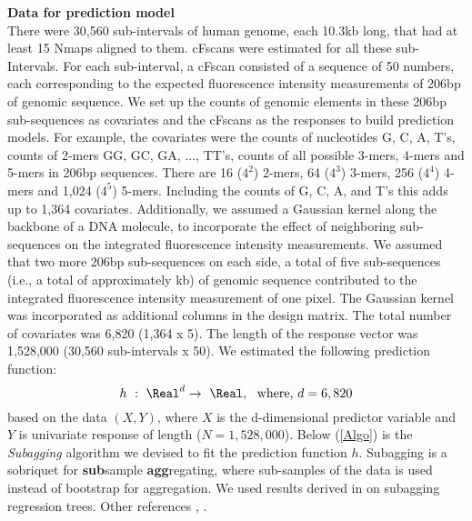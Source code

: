 \noindent
{\bf{Data for prediction model}} \\
There were 30,560 sub-intervals of human genome, each 10.3kb long, that had at least 15 Nmaps aligned to them. cFscans were estimated for all these sub-Intervals. For each sub-interval, a cFscan consisted of a sequence of 50 numbers, each corresponding to the expected fluorescence intensity measurements of 206bp of genomic sequence. We set up the counts of genomic elements in these 206bp sub-sequences as covariates and the cFscans as the responses to build prediction models. For example, the covariates were the counts of nucleotides G, C, A, T's, counts of 2-mers GG, GC, GA, ..., TT's, counts of all possible 3-mers, 4-mers and 5-mers in 206bp sequences. There are 16 ($4^2$) 2-mers, 64 ($4^3$) 3-mers, 256 ($4^4$) 4-mers and 1,024 ($4^5$) 5-mers. Including the counts of G, C, A, and T's this adds up to 1,364 covariates. Additionally, we assumed a Gaussian kernel along the backbone of a DNA molecule, to incorporate the effect of neighboring sub-sequences on the integrated fluorescence intensity measurements. We assumed that two more 206bp sub-sequences on each side, a total of five sub-sequences (i.e., a total of approximately kb) of genomic sequence contributed to the integrated fluorescence intensity measurement of one pixel. The Gaussian kernel was incorporated as additional columns in the design matrix. The total number of covariates was 6,820 (1,364 x 5). The length of the response vector was 1,528,000 (30,560 sub-intervals x 50). We estimated the following prediction function:
\begin{equation}
h \ :\ \Real ^d \rightarrow \ \Real, \ \ \text{where, } d = 6,820
\label{eq:BigModel}
\end{equation}
based on the data $(X, Y)$, where $X$ is the d-dimensional predictor variable and $Y$ is univariate response of length ($N = 1,528,000$). 
Below (\ref{Algo}) is the {\emph{Subagging}} algorithm we devised to fit the prediction function $h$. Subagging is a sobriquet for {\bf{sub}}sample {\bf{agg}}regating, where sub-samples of the data is used instead of bootstrap for aggregation. We used results derived in \cite{Buhlmann_Yu_2002_AnnStat} on subagging regression trees. Other references \cite{Gentle_etal_2012_Handbook}, \cite{Buhlmann_Yu_2003_JASA}. 

